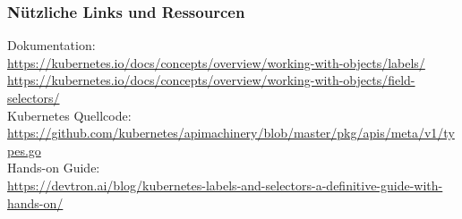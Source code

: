 \subsubsection{Nützliche Links und Ressourcen}
Dokumentation:\\
\url{https://kubernetes.io/docs/concepts/overview/working-with-objects/labels/}\\
\url{https://kubernetes.io/docs/concepts/overview/working-with-objects/field-selectors/}\\
Kubernetes Quellcode:\\
\url{https://github.com/kubernetes/apimachinery/blob/master/pkg/apis/meta/v1/types.go}\\
Hands-on Guide:\\
\url{https://devtron.ai/blog/kubernetes-labels-and-selectors-a-definitive-guide-with-hands-on/}